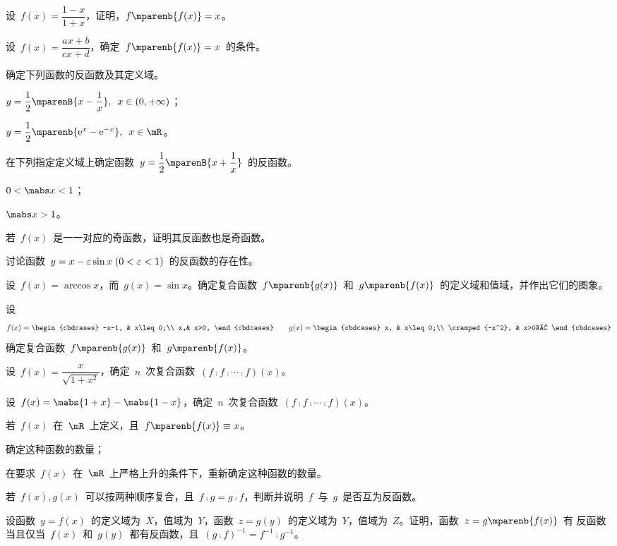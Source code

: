 \begin{exercise}
\item 设~$f(x)=\dfrac{1-x}{1+x}$，证明，$f\mparenb{f(x)}=x$。
\item 设~$f(x)=\dfrac{ax+b}{cx+d}$，确定~$f\mparenb{f(x)}=x$~的条件。
\item 确定下列函数的反函数及其定义域。
\begin{exlistcols}
  \item $\dps y=\frac12\mparenB{x-\frac 1x}\mcond*[\enspace]{x\in(0,+\infty)}$；
  \item $y=\dfrac12\mparenb{\me^x-\me^{-x}}\mcond*[\enspace]{x\in\mR}$。
\end{exlistcols}
\item 在下列指定定义域上确定函数~$\dps y=\frac12\mparenB{x+\frac1x}$~的反函数。
\begin{exlistcols}
  \item $0<\mabs x<1$；
  \item $\mabs x>1$。
\end{exlistcols}
\item 若~$f(x)$~是一一对应的奇函数，证明其反函数也是奇函数。
\item 讨论函数~$y=x-\e\sin x\mcond{0<\e<1}$~的反函数的存在性。
\item 设~$f(x)=\arccos x$，而~$g(x)=\sin x$。确定复合函数~$f\mparenb{g(x)}$~和~$g\mparenb{f(x)}$~的定义域和值域，并作出它们的图象。
\item 设
\[
  f(x)=\begin{cbdcases}
    -x-1, & x\leq0;\\
    x,& x>0,
  \end{cbdcases}\qquad
  g(x)=\begin{cbdcases}
    x,    & x\leq0;\\
    \cramped{-x^2}, & x>0。
  \end{cbdcases}
\]
确定复合函数~$f\mparenb{g(x)}$~和~$g\mparenb{f(x)}$。
\item 设~$f(x)=\dfrac x{\sqrt{1+x^2}}$，确定~$n$~次复合函数~$(f\comp f\comp\dotsb\comp f)(x)$。
\item 设~$f(x)=\mabs{1+x}-\mabs{1-x}$，确定~$n$~次复合函数~$(f\comp f\comp\dotsb\comp f)(x)$。
\item 若~$f(x)$~在~$\mR$~上定义，且~$f\mparenb{f(x)}\equiv x$。
\begin{exlistcols}
  \item 确定这种函数的数量；
  \item 在要求~$f(x)$~在~$\mR$~上严格上升的条件下，重新确定这种函数的数量。
\end{exlistcols}
\item 若~$f(x),g(x)$~可以按两种顺序复合，且~$f\comp g=g\comp f$，判断并说明~$f$~与~$g$~是否互为反函数。
\item 设函数~$y=f(x)$~的定义域为~$X$，值域为~$Y$，函数~$z=g(y)$~的定义域为~$Y$，值域为~$Z$。证明，函数~$z=g\mparenb{f(x)}$~有
反函数当且仅当~$f(x)$~和~$g(y)$~都有反函数，且~$(g\comp f)^{-1}=f^{-1}\comp g^{-1}$。
\end{exercise}


